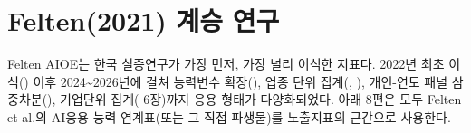 \documentclass[11pt]{article}
\begin{document}
\section{Felten(2021) 계승 연구}

Felten AIOE는 한국 실증연구가 가장 먼저, 가장 널리 이식한 지표다. 2022년 최초 이식(\citet{cheon-2022-ai-employment-wage-effects}) 이후 2024\textasciitilde 2026년에 걸쳐 능력변수 확장(\citet{kiet-2025-ai-occupational-employment-effect}), 업종 단위 집계(\citet{han-2025-ai-diffusion-youth-employment-decline}, \citet{bok-2026-youth-employment-decline-ai-career-ladder}), 개인-연도 패널 삼중차분(\citet{noh-2025-ai-labor-coexistence}), 기업단위 집계(\citet{chang-2024-ai-development-employment-effects} 6장)까지 응용 형태가 다양화되었다. 아래 8편은 모두 Felten et al.의 AI응용-능력 연계표(또는 그 직접 파생물)를 노출지표의 근간으로 사용한다.
\end{document}
